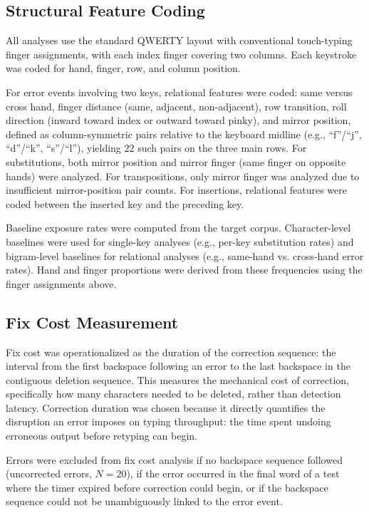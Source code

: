 \documentclass[12pt]{article}
\begin{document}
\subsection{Structural Feature Coding}

All analyses use the standard QWERTY layout with conventional touch-typing finger assignments, with each index finger covering two columns. Each keystroke was coded for hand, finger, row, and column position.

For error events involving two keys, relational features were coded: same versus cross hand, finger distance (same, adjacent, non-adjacent), row transition, roll direction (inward toward index or outward toward pinky), and mirror position, defined as column-symmetric pairs relative to the keyboard midline (e.g., ``f''/``j'', ``d''/``k'', ``s''/``l''), yielding 22 such pairs on the three main rows. For substitutions, both mirror position and mirror finger (same finger on opposite hands) were analyzed. For transpositions, only mirror finger was analyzed due to insufficient mirror-position pair counts. For insertions, relational features were coded between the inserted key and the preceding key.

Baseline exposure rates were computed from the target corpus. Character-level baselines were used for single-key analyses (e.g., per-key substitution rates) and bigram-level baselines for relational analyses (e.g., same-hand vs. cross-hand error rates). Hand and finger proportions were derived from these frequencies using the finger assignments above.

\subsection{Fix Cost Measurement}

Fix cost was operationalized as the duration of the correction sequence: the interval from the first backspace following an error to the last backspace in the contiguous deletion sequence. This measures the mechanical cost of correction, specifically how many characters needed to be deleted, rather than detection latency. Correction duration was chosen because it directly quantifies the disruption an error imposes on typing throughput: the time spent undoing erroneous output before retyping can begin.

Errors were excluded from fix cost analysis if no backspace sequence followed (uncorrected errors, $N = 20$), if the error occurred in the final word of a test where the timer expired before correction could begin, or if the backspace sequence could not be unambiguously linked to the error event.
\end{document}
